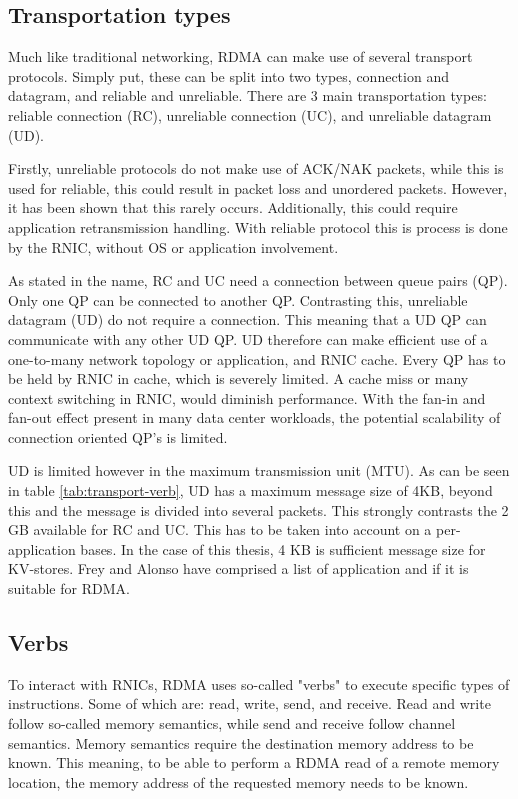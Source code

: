 \subsection{Transportation types}\label{subsec:transportation-types}
Much like traditional networking, RDMA can make use of several transport protocols.
Simply put, these can be split into two types, connection and datagram, and reliable and unreliable.
There are 3 main transportation types: reliable connection (RC), unreliable connection (UC), and unreliable datagram (UD).

Firstly, unreliable protocols do not make use of ACK/NAK packets, while this is used for reliable, this could result in packet loss and unordered packets.
However, it has been shown that this rarely occurs\cite{kalia2014using, kalia2016fasst}.
Additionally, this could require application retransmission handling.
With reliable protocol this is process is done by the RNIC, without OS or application involvement.

As stated in the name, RC and UC need a connection between queue pairs (QP).
Only one QP can be connected to another QP.
Contrasting this, unreliable datagram (UD) do not require a connection.
This meaning that a UD QP can communicate with any other UD QP.
UD therefore can make efficient use of a one-to-many network topology or application, and RNIC cache.
Every QP has to be held by RNIC in cache, which is severely limited\cite{qiu2018toward}.
A cache miss or many context switching in RNIC, would diminish performance.
With the fan-in and fan-out effect present in many data center workloads\cite{vasudevan2009safe}, the potential scalability of connection oriented QP's is limited\cite{kalia2016fasst}.

UD is limited however in the maximum transmission unit (MTU).
As can be seen in table \ref{tab:transport-verb}, UD has a maximum message size of 4KB, beyond this and the message is divided into several packets.
This strongly contrasts the 2 GB available for RC and UC.
This has to be taken into account on a per-application bases.
In the case of this thesis, 4 KB is sufficient message size for KV-stores.
Frey and Alonso have comprised a list of application and if it is suitable for RDMA\cite{frey2009minimizing}.

\subsection{Verbs}\label{subsec:verbs}
To interact with RNICs, RDMA uses so-called "verbs" to execute specific types of instructions.
Some of which are: read, write, send, and receive.
Read and write follow so-called memory semantics, while send and receive follow channel semantics.
Memory semantics require the destination memory address to be known.
This meaning, to be able to perform a RDMA read of a remote memory location, the memory address of the requested memory needs to be known.


